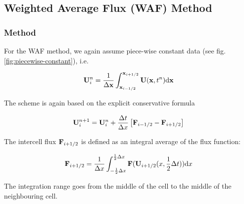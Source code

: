 





\subsection{Weighted Average Flux (WAF) Method}\label{chap:hydro-WAF}







\subsubsection{Method}


For the WAF method, we again assume piece-wise constant data (see fig. \ref{fig:piecewise-constant}), i.e.

\begin{equation}
	\mathbf{U}_i ^ n = \frac{1}{\Delta \mathbf{x}} \int_{\mathbf{x}_{i-1/2}}^{\mathbf{x}_{i+1/2}} \mathbf{U}(\mathbf{x}, t^n) \mathrm{d} \mathbf{x}
\end{equation}

The scheme is again based on the explicit conservative formula

\begin{equation}
	\mathbf{U}_{i}^{n+1} = \mathbf{U}_i^n + \frac{\Delta t}{\Delta x} \left[ \mathbf{F}_{i - 1/2} - \mathbf{F}_{i + 1/2} \right] \label{eq:hydro_basics_waf}
\end{equation}



The intercell flux $\mathbf{F}_{i + 1/2}$ is defined as an integral average of the flux function:

\begin{equation}
	\mathbf{F}_{i + 1/2} = \frac{1}{\Delta x} \int_{-\frac{1}{2} \Delta x} ^{\frac{1}{2} \Delta x} \mathbf{F} (\mathbf{U}_{i+1/2} ( x, \frac{1}{2}\Delta t)) \mathrm{d} x \label{eq:hydro-waf-flux}
\end{equation}

The integration range goes from the middle of the cell to the middle of the neighbouring cell.





